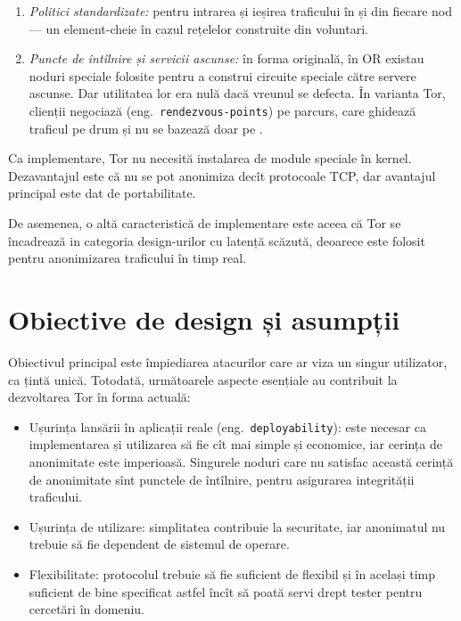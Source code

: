 \begin{enumerate}[(1)]
  \item \textit{Politici standardizate:} pentru intrarea și ieșirea
    traficului în și din fiecare nod --- un element-cheie în cazul
    rețelelor construite din voluntari.
  \item \textit{Puncte de întîlnire și servicii ascunse:} în forma
    originală, în OR existau noduri speciale folosite pentru a construi
    circuite speciale către servere ascunse. Dar utilitatea lor era nulă dacă
    vreunul se defecta. În varianta Tor, clienții negociază  (eng.\ \texttt{rendezvous-points}) pe parcurs, care ghidează
    traficul pe drum și nu se bazează doar pe .
\end{enumerate}

Ca implementare, Tor nu necesită instalarea de module speciale în kernel.
Dezavantajul este că nu se pot anonimiza decît protocoale TCP, dar avantajul
principal este dat de portabilitate.

De asemenea, o altă caracteristică de implementare este aceea că Tor se 
încadrează in categoria design-urilor cu latență scăzută, deoarece este
folosit pentru anonimizarea traficului în timp real.



\section{Obiective de design și asumpții}

\indent\indent Obiectivul principal este împiediarea atacurilor care ar viza un singur
utilizator, ca țintă unică. Totodată, următoarele aspecte esențiale au
contribuit la dezvoltarea Tor în forma actuală:
\begin{itemize}
  \item Ușurința lansării în aplicații reale (eng.\ \texttt{deployability}): este
    necesar ca implementarea și utilizarea să fie cît mai simple și
    economice, iar cerința de anonimitate este imperioasă. Singurele
    noduri care nu satisfac această cerință de anonimitate sînt punctele
    de întîlnire, pentru asigurarea integrității traficului.
  \item Ușurința de utilizare: simplitatea contribuie la se\-cu\-ri\-ta\-te, iar
    a\-no\-ni\-ma\-tul nu tre\-bu\-ie să fie dependent de sistemul de operare.
  \item Flexibilitate: protocolul trebuie să fie suficient de flexibil și
    în același timp suficient de bine specificat astfel încît să poată
    servi drept tester pentru cercetări în domeniu.
\end{itemize}

